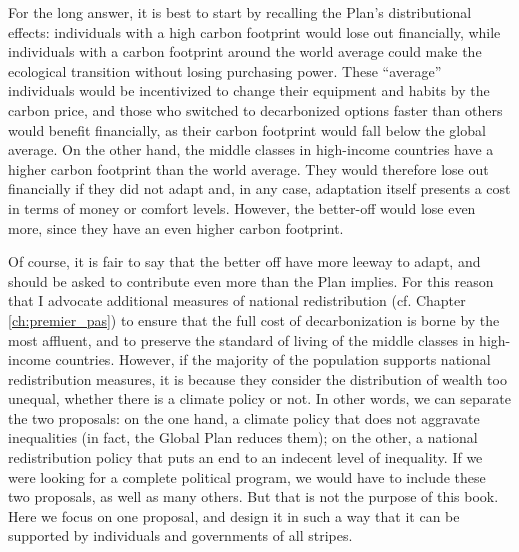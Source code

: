\documentclass[a5paper,english,openany]{memoir}
\begin{document}
For the long answer, it is best to %
start by recalling the Plan's distributional effects: individuals with a high carbon footprint would lose out financially, while individuals with a carbon footprint around the world average could make the ecological transition %
without losing purchasing power. These ``average'' individuals would be incentivized %
to change their equipment and habits by the carbon price, and those who switched to decarbonized %
options faster than others would benefit financially, as their carbon footprint would fall below the global average. %
On the other hand, the middle classes in high-income countries have a higher carbon footprint %
than the world average. %
They would therefore lose out financially if they did not adapt and, in any case, adaptation itself presents a cost in terms of money or comfort levels. %
However, the better-off would lose even more, since they have an even higher carbon footprint. 

Of course, it is fair to say that the better off %
have more leeway to adapt, and should be asked to contribute even more than the Plan implies. For this reason %
that %
I advocate additional measures of national redistribution (cf. Chapter \ref{ch:premier_pas}) to ensure that the full cost of decarbonization %
is borne by the most affluent, and to preserve the standard of living of the middle classes in high-income countries. However, if the majority of the population supports national redistribution measures, it is because they consider the distribution of wealth too unequal, whether there is a climate policy or not. In other words, we can separate the two proposals: on the one hand, a climate policy that does not aggravate inequalities (in fact, the Global Plan reduces them); on the other, a national redistribution policy that puts an end to an indecent level of inequality. If we were looking for a complete political program, we would %
have to include these two proposals, as well as many others. But that is %
not the purpose of this book. Here we focus %
on one proposal, and design it in such a way that it can be supported by individuals and governments of all stripes. 
\end{document}
